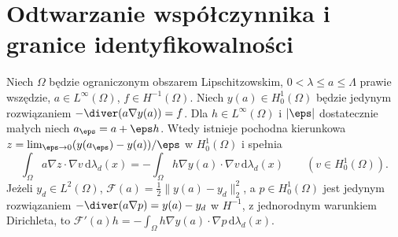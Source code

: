 \section{Odtwarzanie współczynnika i granice identyfikowalności}
\begin{stwierdzenie}
\label{prop:pde32-coeff-gradient}
Niech $\Omega$ będzie ograniczonym obszarem Lipschitzowskim,
$0<\lambda\le a\le\Lambda$ prawie wszędzie,
$a\in L^\infty(\Omega)$, $f\in H^{-1}(\Omega)$.
Niech $y(a)\in H_0^1(\Omega)$ będzie jedynym rozwiązaniem
$-\diver(a\nabla y(a))=f$.
Dla $h\in L^\infty(\Omega)$ i $|\eps|$ dostatecznie małych
niech $a_\eps=a+\eps h$. Wtedy istnieje pochodna kierunkowa
$z=\lim_{\eps\to0}(y(a_\eps)-y(a))/\eps$ w $H_0^1(\Omega)$
i spełnia
\begin{equation}\label{eq:pde32-coeff-linear}
 \int_\Omega a\nabla z\cdot\nabla v
 \,\mathrm d\lambda_d(x)
 =-\int_\Omega h\nabla y(a)\cdot\nabla v
 \,\mathrm d\lambda_d(x)\qquad(v\in H_0^1(\Omega)).
\end{equation}
Jeżeli $y_d\in L^2(\Omega)$,
$\mathcal F(a)=\frac12\|y(a)-y_d\|_2^2$,
a $p\in H_0^1(\Omega)$ jest jedynym rozwiązaniem
$-\diver(a\nabla p)=y(a)-y_d$ w $H^{-1}$,
z jednorodnym warunkiem Dirichleta, to
$\mathcal F'(a)h=-\int_\Omega
h\nabla y(a)\cdot\nabla p\,\mathrm d\lambda_d(x)$.
\end{stwierdzenie}
